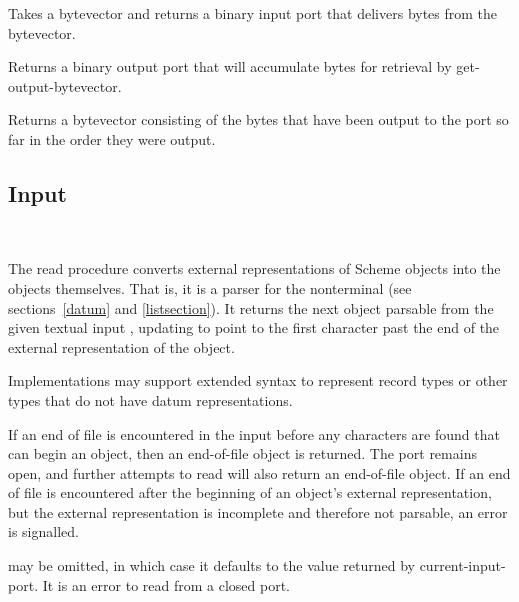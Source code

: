 \begin{entry}{%
}

Takes a bytevector and returns a binary input port that delivers
bytes from the bytevector.

\end{entry}

\begin{entry}{%
}

Returns a binary output port that will accumulate bytes for
retrieval by {\cf get-output-bytevector}.

\end{entry}

\begin{entry}{%
}

  Returns a bytevector consisting
of the bytes that have been output to the port so far in the
order they were output.
\end{entry}


\subsection{Input}
\label{inputsection}

\noindent \hbox{ }  %
\vspace{-5ex}

\begin{entry}{%
}

The {\cf read} procedure converts external representations of Scheme objects into the
objects themselves.  That is, it is a parser for the nonterminal
 (see sections~\ref{datum} and
\ref{listsection}).  It returns the next
object parsable from the given textual input , updating
 to point to
the first character past the end of the external representation of the object.

Implementations may support extended syntax to represent record types or
other types that do not have datum representations.

\vest If an end of file is encountered in the input before any
characters are found that can begin an object, then an end-of-file
object is returned.  The port remains open, and further attempts
to read will also return an end-of-file object.  If an end of file is
encountered after the beginning of an object's external representation,
but the external representation is incomplete and therefore not parsable,
an error is signalled.

 may be omitted, in which case it defaults to the
value returned by {\cf current-input-port}.  It is an error to read from
a closed port.
\end{entry}

